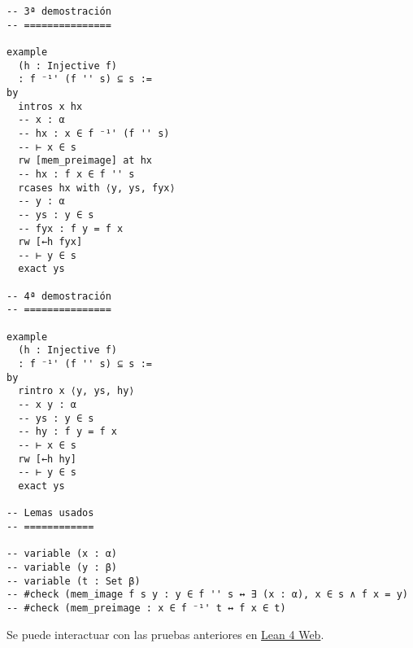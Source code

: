 \begin{verbatim}
-- 3ª demostración
-- ===============

example
  (h : Injective f)
  : f ⁻¹' (f '' s) ⊆ s :=
by
  intros x hx
  -- x : α
  -- hx : x ∈ f ⁻¹' (f '' s)
  -- ⊢ x ∈ s
  rw [mem_preimage] at hx
  -- hx : f x ∈ f '' s
  rcases hx with ⟨y, ys, fyx⟩
  -- y : α
  -- ys : y ∈ s
  -- fyx : f y = f x
  rw [←h fyx]
  -- ⊢ y ∈ s
  exact ys

-- 4ª demostración
-- ===============

example
  (h : Injective f)
  : f ⁻¹' (f '' s) ⊆ s :=
by
  rintro x ⟨y, ys, hy⟩
  -- x y : α
  -- ys : y ∈ s
  -- hy : f y = f x
  -- ⊢ x ∈ s
  rw [←h hy]
  -- ⊢ y ∈ s
  exact ys

-- Lemas usados
-- ============

-- variable (x : α)
-- variable (y : β)
-- variable (t : Set β)
-- #check (mem_image f s y : y ∈ f '' s ↔ ∃ (x : α), x ∈ s ∧ f x = y)
-- #check (mem_preimage : x ∈ f ⁻¹' t ↔ f x ∈ t)
\end{verbatim}
Se puede interactuar con las pruebas anteriores en \href{https://lean.math.hhu.de/\#url=https://raw.githubusercontent.com/jaalonso/Calculemus2/main/src/Imagen\_inversa\_de\_la\_imagen\_de\_aplicaciones\_inyectivas.lean}{Lean 4 Web}.

